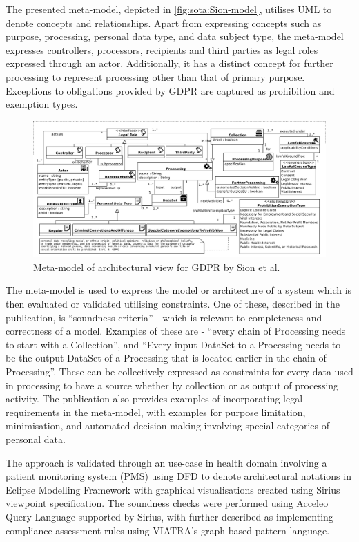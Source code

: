 The presented meta-model, depicted in \autoref{fig:sota:Sion-model}, utilises UML to denote concepts and relationships. Apart from expressing concepts such as purpose, processing, personal data type, and data subject type, the meta-model expresses controllers, processors, recipients and third parties as legal roles expressed through an actor. Additionally, it has a distinct concept for further processing to represent processing other than that of primary purpose. Exceptions to obligations provided by GDPR are captured as prohibition and exemption types.
\begin{figure}[htbp]
    \centering
    \includegraphics[width=\linewidth]{img/Sion_model.png}
    \caption{Meta-model of architectural view for GDPR by Sion et al. \cite{sion_architectural_2019}}
    \label{fig:sota:Sion-model}
\end{figure}

The meta-model is used to express the model or architecture of a system which is then evaluated or validated utilising constraints. One of these, described in the publication, is ``soundness criteria'' - which is relevant to completeness and correctness of a model. Examples of these are - ``every chain of Processing needs to start with a Collection'', and ``Every input DataSet to a Processing needs to be the output DataSet of a Processing that is located earlier in the chain of Processing''. These can be collectively expressed as constraints for every data used in processing to have a source whether by collection or as output of processing activity. The publication also provides examples of incorporating legal requirements in the meta-model, with examples for purpose limitation, minimisation, and automated decision making involving special categories of personal data. 

The approach is validated through an use-case in health domain involving a patient monitoring system (PMS) using DFD to denote architectural notations in Eclipse Modelling Framework with graphical visualisations created using Sirius viewpoint specification. The soundness checks were performed using  Acceleo Query Language supported by Sirius, with further described as implementing compliance assessment rules using VIATRA’s graph-based pattern language.

